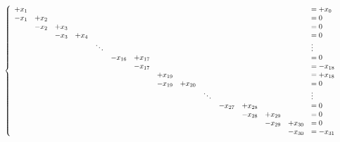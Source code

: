 \documentclass[notitlepage]{report}
\begin{document}
\begin{equation}
\nonumber
\resizebox{\hsize}{!}{
$\left\{
\begin{array}{ccccccccccccccl}
       +x_1  &      &      &         &        &            &         &                   &            &        &            &         &         &                   &= +x_0 \\
        -x_1 & +x_2 &      &         &        &            &         &                   &            &        &            &         &         &                   &= 0 \\
             & -x_2 & +x_3 &         &        &            &         &                   &            &        &            &         &         &                   &= 0 \\
             &      & -x_3 & +x_4    &        &            &         &                   &            &        &            &         &         &                   &= 0 \\
             &      &      &         & \ddots &            &         &                   &            &        &            &         &         &                   &  \vdots  \\
             &      &      &         &        &    -x_{16} & +x_{17} &                   &            &        &            &         &         &                   &= 0 \\
             &      &      &         &        &            & -x_{17} &                   &            &        &            &         &         &                   &= -x_{18} \\
             &      &      &         &        &            &         &           +x_{19} &            &        &            &         &         &                   &= +x_{18} \\
             &      &      &         &        &            &         &           -x_{19} & +x_{20}    &        &            &         &         &                   &= 0 \\
             &      &      &         &        &            &         &                   &            & \ddots &            &         &         &                   &  \vdots  \\
             &      &      &         &        &            &         &                   &            &        &    -x_{27} & +x_{28} &         &                   &= 0 \\
             &      &      &         &        &            &         &                   &            &        &            & -x_{28} & +x_{29} &                   &= 0 \\
             &      &      &         &        &            &         &                   &            &        &            &         & -x_{29} & +x_{30}           &= 0 \\
             &      &      &         &        &            &         &                   &            &        &            &         &         & -x_{30}           &= -x_{31} \\
\end{array}
\right.$
}
\end{equation}
\end{document}
